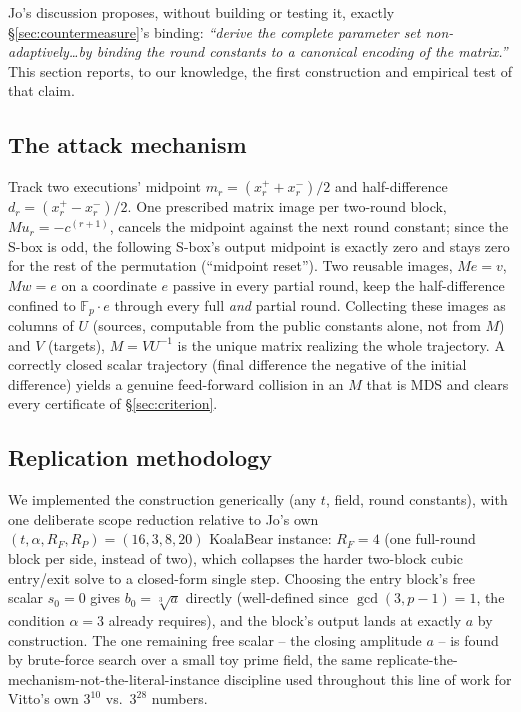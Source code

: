\documentclass[conference]{IEEEtran}
\theoremstyle{definition}
\theoremstyle{plain}
\begin{document}
Jo's discussion proposes, without building or testing it, exactly
\S\ref{sec:countermeasure}'s binding: \emph{``derive the complete
parameter set non-adaptively\dots by binding the round constants to a
canonical encoding of the matrix.''} This section reports, to our
knowledge, the first construction and empirical test of that claim.

\subsection{The attack mechanism}
Track two executions' midpoint $m_r=(x^+_r+x^-_r)/2$ and half-difference
$d_r=(x^+_r-x^-_r)/2$. One prescribed matrix image per two-round block,
$Mu_r=-c^{(r+1)}$, cancels the midpoint against the next round constant;
since the S-box is odd, the following S-box's output midpoint is exactly
zero and stays zero for the rest of the permutation (``midpoint
reset''). Two reusable images, $Me=v$, $Mw=e$ on a coordinate $e$
passive in every partial round, keep the half-difference confined to
$\mathbb F_p\cdot e$ through every full \emph{and} partial round.
Collecting these images as columns of $U$ (sources, computable from the
public constants alone, not from $M$) and $V$ (targets), $M=VU^{-1}$ is
the unique matrix realizing the whole trajectory. A correctly closed
scalar trajectory (final difference the negative of the initial
difference) yields a genuine feed-forward collision in an $M$ that is
MDS and clears every certificate of \S\ref{sec:criterion}.

\subsection{Replication methodology}
We implemented the construction generically (any $t$, field, round
constants), with one deliberate scope reduction relative to Jo's own
$(t,\alpha,R_F,R_P)=(16,3,8,20)$ KoalaBear instance: $R_F=4$ (one
full-round block per side, instead of two), which collapses the harder
two-block cubic entry/exit solve to a closed-form single step. Choosing
the entry block's free scalar $s_0=0$ gives $b_0=\sqrt[3]{a}$ directly
(well-defined since $\gcd(3,p-1)=1$, the condition $\alpha=3$ already
requires), and the block's output lands at exactly $a$ by construction.
The one remaining free scalar -- the closing amplitude $a$ -- is found
by brute-force search over a small toy prime field, the same
replicate-the-mechanism-not-the-literal-instance discipline used
throughout this line of work for Vitto's own $3^{10}$ vs.\ $3^{28}$
numbers.
\end{document}
